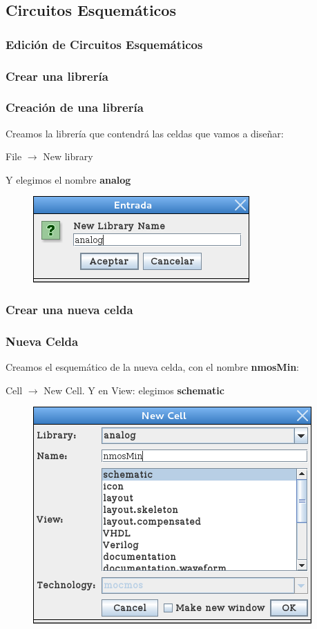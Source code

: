 \documentclass{beamer}
\begin{document}
\begin{frame}
\subsection{Circuitos Esquemáticos}
\frametitle{Edición de Circuitos Esquemáticos}
\end{frame}
\begin{frame}
\subsubsection{Crear una librería}
\frametitle{Creación de una librería}
Creamos la librería que contendrá las celdas que vamos a diseñar:

File $\rightarrow$ New library

Y elegimos el nombre \textbf{analog}
\begin{figure}
\includegraphics[width=0.35\linewidth]{figuras/edicionElectric.png}
\end{figure}
\end{frame}
\begin{frame}
\subsubsection{Crear una nueva celda }
\frametitle{Nueva Celda}
Creamos el esquemático de la nueva celda, con el nombre \textbf{nmosMin}: 

Cell $\rightarrow$ New Cell.
Y en View: elegimos \textbf{schematic}
\begin{figure}
\includegraphics[width=0.45\linewidth]{figuras/edicionElectric-1.png}
\end{figure}
\end{frame}
\end{document}

